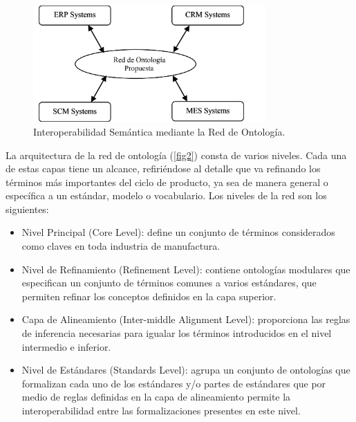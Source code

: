 \documentclass[journal]{IEEEtran}
\begin{document}
\begin{figure}[!t]
\centering
\includegraphics[width=3.5in]{figures/figure1.png}
\caption{Interoperabilidad Sem\'antica mediante la Red de Ontolog\'ia.}
\label{fig1}
\end{figure}

La arquitectura de la red de ontolog\'ia (\ref{fig2}) consta de varios niveles. Cada una de estas capas tiene un alcance, refiri\'endose al detalle que va refinando los t\'erminos m\'as importantes del ciclo de producto, ya sea de manera general o espec\'ifica a un est\'andar, modelo o vocabulario. Los niveles de la red son los siguientes:

\begin{itemize}
    \item Nivel Principal (Core Level): define un conjunto de t\'erminos considerados como claves en toda industria de manufactura.
    \item Nivel de Refinamiento (Refinement Level): contiene ontolog\'ias modulares que especifican un conjunto de t\'erminos comunes a varios est\'andares, que permiten refinar los conceptos definidos en la capa superior.
    \item Capa de Alineamiento (Inter-middle Alignment Level): proporciona las reglas de inferencia necesarias para igualar los t\'erminos introducidos en el nivel intermedio e inferior.
    \item Nivel de Est\'andares (Standards Level): agrupa un conjunto de ontolog\'ias que formalizan cada uno de los est\'andares y/o partes de est\'andares que por medio de reglas definidas en la capa de alineamiento permite la interoperabilidad entre las formalizaciones presentes en este nivel.  
\end{itemize}
\end{document}
